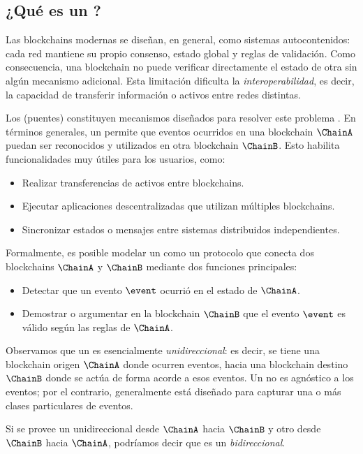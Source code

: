 
\subsection{¿Qué es un \Bridge?}

Las blockchains modernas se diseñan, en general, como sistemas autocontenidos: cada red mantiene su propio consenso, estado global y reglas de validación. Como consecuencia, una blockchain no puede verificar directamente el estado de otra sin algún mecanismo adicional. Esta limitación dificulta la \emph{interoperabilidad}, es decir, la capacidad de transferir información o activos entre redes distintas.

Los \Bridges (puentes) constituyen mecanismos diseñados para resolver este problema \cite{Belchior2021}. En términos generales, un \Bridge permite que eventos ocurridos en una blockchain $\ChainA$ puedan ser reconocidos y utilizados en otra blockchain $\ChainB$. Esto habilita funcionalidades muy útiles para los usuarios, como:
\begin{itemize}[noitemsep]
	\item Realizar transferencias de activos entre blockchains.
	\item Ejecutar aplicaciones descentralizadas que utilizan múltiples blockchains.
	\item Sincronizar estados o mensajes entre sistemas distribuidos independientes.
\end{itemize}

Formalmente, es posible modelar un \Bridge como un protocolo que conecta dos blockchains $\ChainA$ y $\ChainB$ mediante dos funciones principales:
\begin{itemize}[noitemsep]
	\item Detectar que un evento $\event$ ocurrió en el estado de $\ChainA$.
	\item Demostrar o argumentar en la blockchain $\ChainB$ que el evento $\event$ es válido según las reglas de $\ChainA$.
\end{itemize}

Observamos que un \Bridge es esencialmente \emph{unidireccional}: es decir, se tiene una blockchain origen $\ChainA$ donde ocurren eventos, hacia una blockchain destino $\ChainB$ donde se actúa de forma acorde a esos eventos. Un \Bridge no es agnóstico a los eventos; por el contrario, generalmente está diseñado para capturar una o más clases particulares de eventos.

Si se provee un \Bridge unidireccional desde $\ChainA$ hacia $\ChainB$ y otro desde $\ChainB$ hacia $\ChainA$, podríamos decir que es un \textit{\Bridge bidireccional}.


